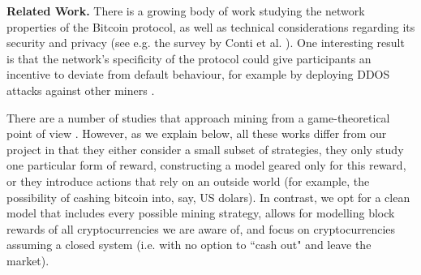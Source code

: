 \smallskip
\noindent
{\bf Related Work.} There is a growing body of work studying the network properties of the Bitcoin protocol, as well as technical considerations regarding its security and privacy (see e.g. the survey by Conti et al. \cite{conti2018survey}). One interesting result is that the network's specificity of the protocol could give participants an incentive to deviate from default behaviour, for example by deploying DDOS attacks against other miners \cite{bitcoin_attacks_2013,ddos_attacks2014,empirical_dos_attacks2014}. 

There are a number of studies that approach mining from a game-theoretical point of view \cite{mininggames:2016,optimalselfishmining2017,instabilitywithoutreward:2016,selfishmining2014,stop_selfish_mining2014,eclipseattacks2015,LBSZR15,LJG15,stubborn_mining:2016,economics_of_mining2013,ZGR17,ABLZ17,MHG18,SZWTK18}
. However, as we explain below, all these works 
differ from our project in that they either consider a small subset of strategies, they only study one particular form of reward, constructing a model geared only for this reward, 
or they introduce actions that rely on an outside world (for example, the possibility of cashing bitcoin into, say, US dolars). In contrast, we opt for a clean model that includes every possible mining strategy, allows for modelling block rewards of all cryptocurrencies we are aware of, and focus on cryptocurrencies assuming a closed system (i.e. with no option to ``cash out" and leave the market). 

